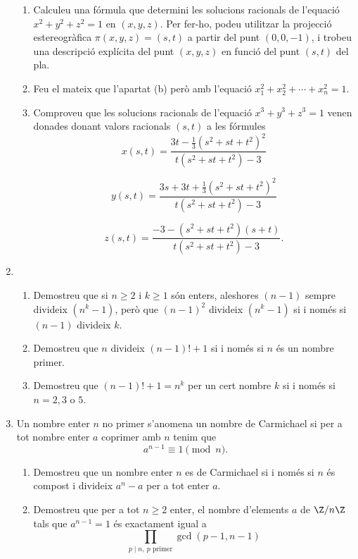 \begin{enumerate}[leftmargin=*]
\begin{enumerate}
\item Calculeu una fórmula que determini les solucions
racionals de l'equació $x^2+y^2+z^2=1$ en $(x,y,z)$. Per fer-ho,
podeu utilitzar la projecció estereogràfica $\pi(x,y,z)=(s,t)$ a
partir del punt $(0,0,-1)$, i trobeu una descripció explícita del
punt $(x,y,z)$ en funció del punt $(s,t)$ del pla.

\item Feu el mateix que l'apartat (b) però amb
l'equació $x_1^2+x_2^2+\cdots+x_n^2=1$.

\item Comproveu que les solucions racionals de l'equació
$x^3+y^3+z^3=1$ venen donades donant valors racionals $(s,t)$ a les
fórmules $$ x(s,t) = \frac{3 t - \frac 13 (s^2 + s t + t^2)^2}{t
(s^2 + s t + t^2) - 3} $$

$$y(s,t) = \frac{3 s + 3 t + \frac 13 (s^2 + s t + t^2)^2}{t
(s^2 + s t + t^2) - 3}$$

$$ z(s,t) = \frac{-3 - (s^2 + s t + t^2) (s + t)}{t (s^2 + s t
+ t^2) - 3}.$$

\end{enumerate}

\item
\begin{enumerate}
\item Demostreu que si $n\ge 2$ i $k\ge 1$ són enters,
aleshores $(n-1)$ sempre divideix $(n^k-1)$, però que $(n-1)^2$
divideix $(n^k-1)$ si i només si $(n-1)$ divideix $k$.

\item Demostreu que $n$ divideix $(n-1)!+1$ si i només si $n$
és un nombre primer.

\item Demostreu que $(n-1)!+1=n^k$ per un cert nombre $k$ si i
només si $n=2,3$ o $5$.

\end{enumerate}

\item Un nombre enter $n$ no primer s'anomena un nombre de
Carmichael si per a tot nombre enter $a$ coprimer amb $n$ tenim que
$$a^{n-1} \equiv 1 \pmod{n}.$$

\begin{enumerate}
\item Demostreu que un nombre enter $n$ es de Carmichael si i
només si $n$ és compost i divideix $a^n-a$ per a tot enter $a$.

\item Demostreu que per a tot $n\ge 2$ enter, el nombre d'elements $a$ de $\Z/n\Z$ tals que $a^{n-1}=1$ és exactament igual a
$$\prod_{p \mid n, \ p \text{ primer}} \gcd(p-1,n-1)$$


\end{enumerate}
\end{enumerate}
